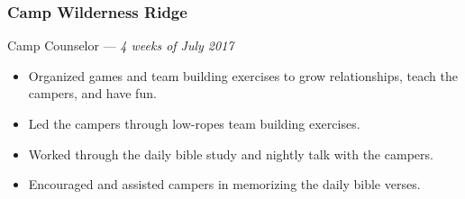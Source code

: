 \documentclass[letterpaper,10pt]{article}
\begin{document}
    \subsubsection{Camp Wilderness Ridge}
    \hfill Camp Counselor --- \emph{4 weeks of July 2017}

    \begin{itemize}
        \tightlist{}
        \item
        Organized games and team building exercises to grow relationships, teach the campers, and have fun.
        \item
        Led the campers through low-ropes team building exercises.
        \item
        Worked through the daily bible study and nightly talk with the campers.
        \item
        Encouraged and assisted campers in memorizing the daily bible verses.
    \end{itemize}
\end{document}
